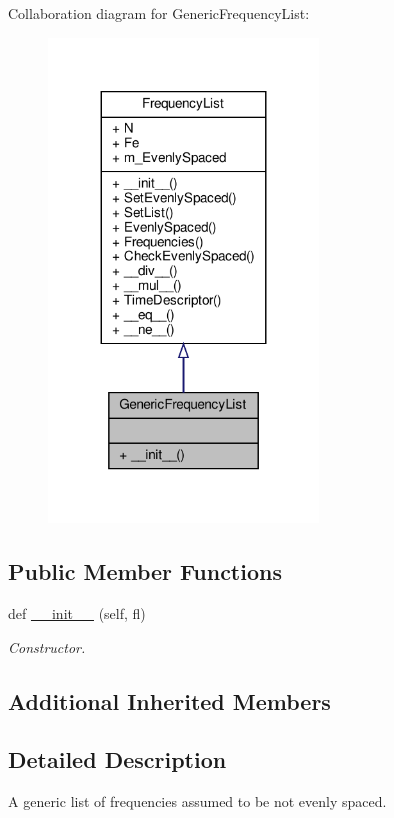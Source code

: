 Collaboration diagram for Generic\+Frequency\+List\+:\nopagebreak
\begin{figure}[H]
\begin{center}
\leavevmode
\includegraphics[width=203pt]{classSignalIntegrity_1_1FrequencyDomain_1_1FrequencyList_1_1GenericFrequencyList__coll__graph}
\end{center}
\end{figure}
\subsection*{Public Member Functions}
\begin{DoxyCompactItemize}
\item 
def \hyperlink{classSignalIntegrity_1_1FrequencyDomain_1_1FrequencyList_1_1GenericFrequencyList_a9a74e46546d1e8002152b5d0e79786c4}{\+\_\+\+\_\+init\+\_\+\+\_\+} (self, fl)
\begin{DoxyCompactList}\small\item\em Constructor. \end{DoxyCompactList}\end{DoxyCompactItemize}
\subsection*{Additional Inherited Members}


\subsection{Detailed Description}
A generic list of frequencies assumed to be not evenly spaced. 




